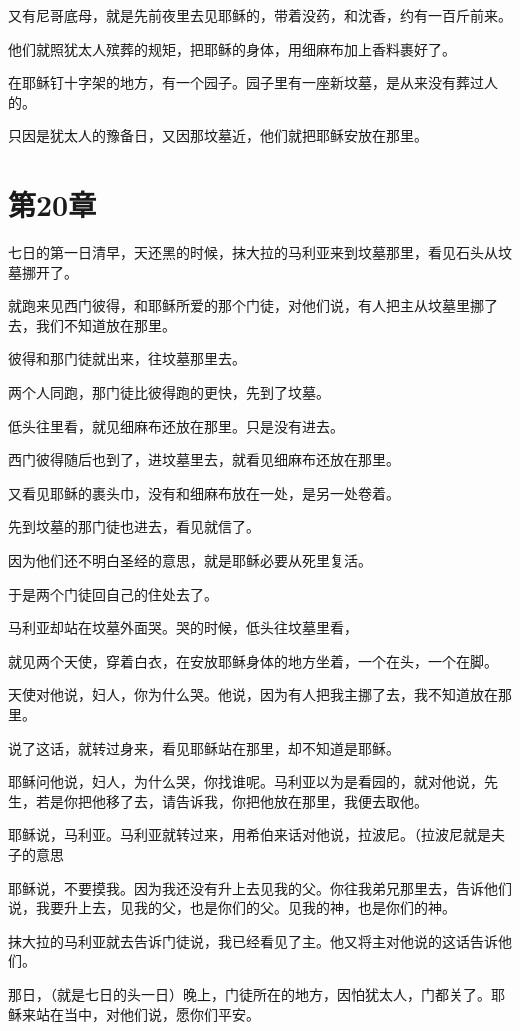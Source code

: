 \documentclass[12pt,oneside]{book}
\begin{document}
又有尼哥底母，就是先前夜里去见耶稣的，带着没药，和沈香，约有一百斤前来。

他们就照犹太人殡葬的规矩，把耶稣的身体，用细麻布加上香料裹好了。

在耶稣钉十字架的地方，有一个园子。园子里有一座新坟墓，是从来没有葬过人的。

只因是犹太人的豫备日，又因那坟墓近，他们就把耶稣安放在那里。

\chapter{第20章}
七日的第一日清早，天还黑的时候，抹大拉的马利亚来到坟墓那里，看见石头从坟墓挪开了。

就跑来见西门彼得，和耶稣所爱的那个门徒，对他们说，有人把主从坟墓里挪了去，我们不知道放在那里。

彼得和那门徒就出来，往坟墓那里去。

两个人同跑，那门徒比彼得跑的更快，先到了坟墓。

低头往里看，就见细麻布还放在那里。只是没有进去。

西门彼得随后也到了，进坟墓里去，就看见细麻布还放在那里。

又看见耶稣的裹头巾，没有和细麻布放在一处，是另一处卷着。

先到坟墓的那门徒也进去，看见就信了。

因为他们还不明白圣经的意思，就是耶稣必要从死里复活。

于是两个门徒回自己的住处去了。

马利亚却站在坟墓外面哭。哭的时候，低头往坟墓里看，

就见两个天使，穿着白衣，在安放耶稣身体的地方坐着，一个在头，一个在脚。

天使对他说，妇人，你为什么哭。他说，因为有人把我主挪了去，我不知道放在那里。

说了这话，就转过身来，看见耶稣站在那里，却不知道是耶稣。

耶稣问他说，妇人，为什么哭，你找谁呢。马利亚以为是看园的，就对他说，先生，若是你把他移了去，请告诉我，你把他放在那里，我便去取他。

耶稣说，马利亚。马利亚就转过来，用希伯来话对他说，拉波尼。（拉波尼就是夫子的意思

耶稣说，不要摸我。因为我还没有升上去见我的父。你往我弟兄那里去，告诉他们说，我要升上去，见我的父，也是你们的父。见我的神，也是你们的神。

抹大拉的马利亚就去告诉门徒说，我已经看见了主。他又将主对他说的这话告诉他们。

那日，（就是七日的头一日）晚上，门徒所在的地方，因怕犹太人，门都关了。耶稣来站在当中，对他们说，愿你们平安。
\end{document}

